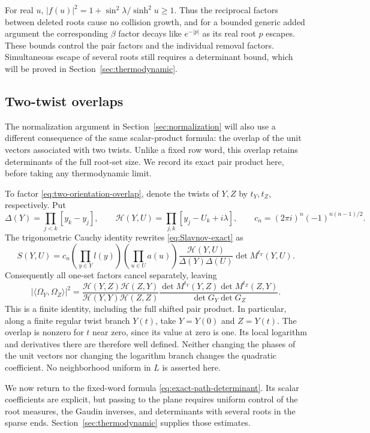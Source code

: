 For real $u$, $|f(u)|^2=1+\sin^2\lambda/\sinh^2u\ge1$.
Thus the reciprocal factors between deleted roots cause no collision
growth, and for a bounded generic added argument the corresponding
$\beta$ factor decays like $e^{-|p|}$ as its real root $p$ escapes.
These bounds control the pair factors and the individual removal factors.
Simultaneous escape of several roots still requires a determinant bound,
which will be proved in Section~\ref{sec:thermodynamic}.

\subsection{Two-twist overlaps}

The normalization argument in Section~\ref{sec:normalization} will
also use a different consequence of the same scalar-product formula:
the overlap of the unit vectors associated with two twists.
Unlike a fixed row word, this overlap retains determinants of the full
root-set size. We record its exact pair product here, before taking
any thermodynamic limit.

To factor \eqref{eq:two-orientation-overlap}, denote the twists of $Y,Z$ by
$t_Y,t_Z$, respectively.  Put
\[
 \Delta(Y)=\prod_{j<k}[y_k-y_j],\qquad
 \mathcal H(Y,U)=\prod_{j,k}[y_j-U_k+i\lambda],\qquad
 c_n=(2\pi i)^n(-1)^{n(n-1)/2}.
\]
The trigonometric Cauchy identity rewrites
\eqref{eq:Slavnov-exact} as
\begin{equation}\label{eq:Slavnov-separated}
 S(Y,U)=c_n\left(\prod_{y\in Y}l(y)\right)
             \left(\prod_{u\in U}a(u)\right)
       \frac{\mathcal H(Y,U)}{\Delta(Y)\Delta(U)}
             \det M^{t_Y}(Y,U).
\end{equation}
Consequently all one-set factors cancel separately, leaving
\begin{equation}\label{eq:overlap-determinant-finite}
 |\langle\Omega_Y,\Omega_Z\rangle|^2
 =\frac{\mathcal H(Y,Z)\mathcal H(Z,Y)}
        {\mathcal H(Y,Y)\mathcal H(Z,Z)}
   \frac{\det M^{t_Y}(Y,Z)\det M^{t_Z}(Z,Y)}
        {\det G_Y\det G_Z}.
\end{equation}
This is a finite identity, including the full shifted pair product.
In particular, along a finite regular twist branch $Y(t)$, take
$Y=Y(0)$ and $Z=Y(t)$. The overlap is nonzero for $t$ near zero,
since its value at zero is one.  Its local logarithm and derivatives
there are therefore well defined.  Neither changing the phases of the
unit vectors nor changing the logarithm branch changes the quadratic
coefficient.  No neighborhood uniform in $L$ is asserted here.


We now return to the fixed-word formula
\eqref{eq:exact-path-determinant}. Its scalar coefficients are explicit,
but passing to the plane requires uniform control of the root measures,
the Gaudin inverses, and determinants with several roots in the sparse
ends. Section~\ref{sec:thermodynamic} supplies those estimates.
